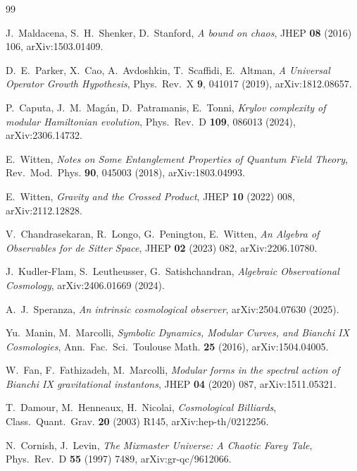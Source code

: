 \documentclass[12pt,a4paper]{article}
\begin{document}
\begin{thebibliography}{99}

J.~Maldacena, S.~H.~Shenker, D.~Stanford,
\emph{A bound on chaos},
JHEP \textbf{08} (2016) 106, arXiv:1503.01409.

D.~E.~Parker, X.~Cao, A.~Avdoshkin, T.~Scaffidi, E.~Altman,
\emph{A Universal Operator Growth Hypothesis},
Phys.~Rev.~X \textbf{9}, 041017 (2019), arXiv:1812.08657.

P.~Caputa, J.~M.~Mag\'{a}n, D.~Patramanis, E.~Tonni,
\emph{Krylov complexity of modular Hamiltonian evolution},
Phys.~Rev.~D \textbf{109}, 086013 (2024), arXiv:2306.14732.

E.~Witten,
\emph{Notes on Some Entanglement Properties of Quantum Field Theory},
Rev.~Mod.~Phys. \textbf{90}, 045003 (2018), arXiv:1803.04993.

E.~Witten,
\emph{Gravity and the Crossed Product},
JHEP \textbf{10} (2022) 008, arXiv:2112.12828.

V.~Chandrasekaran, R.~Longo, G.~Penington, E.~Witten,
\emph{An Algebra of Observables for de Sitter Space},
JHEP \textbf{02} (2023) 082, arXiv:2206.10780.

J.~Kudler-Flam, S.~Leutheusser, G.~Satishchandran,
\emph{Algebraic Observational Cosmology},
arXiv:2406.01669 (2024).

A.~J.~Speranza,
\emph{An intrinsic cosmological observer},
arXiv:2504.07630 (2025).

Yu.~Manin, M.~Marcolli,
\emph{Symbolic Dynamics, Modular Curves, and Bianchi IX Cosmologies},
Ann.~Fac.~Sci.~Toulouse Math. \textbf{25} (2016), arXiv:1504.04005.

W.~Fan, F.~Fathizadeh, M.~Marcolli,
\emph{Modular forms in the spectral action of Bianchi IX
gravitational instantons},
JHEP \textbf{04} (2020) 087, arXiv:1511.05321.

T.~Damour, M.~Henneaux, H.~Nicolai,
\emph{Cosmological Billiards},
Class.~Quant.~Grav. \textbf{20} (2003) R145, arXiv:hep-th/0212256.

N.~Cornish, J.~Levin,
\emph{The Mixmaster Universe: A Chaotic Farey Tale},
Phys.~Rev.~D \textbf{55} (1997) 7489, arXiv:gr-qc/9612066.


\end{thebibliography}
\end{document}

